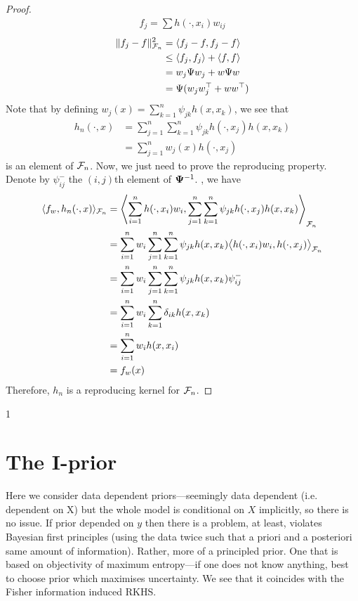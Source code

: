 \documentclass[a4paper,showframe,11pt,draft]{report}
\begin{document}
\begin{proof}
  \begin{align*}
    f_j = \sum h(\cdot,x_i)w_{ij}
  \end{align*}
  \begin{align*}
    \lVert f_j-f\rVert_{{\mathcal F}_n}^2 &= \langle f_j-f,f_j-f\rangle \\
    &\leq \langle f_j,f_j\rangle + \langle f,f\rangle \\
    &= w_j\Psi w_j + w\Psi w \\
    &= \Psi(w_jw_j^\top + ww^\top)
  \end{align*}
  Note that by defining $w_j(x) = \sum_{k=1}^n \psi_{jk} h(x,x_k)$, we see that
  \begin{align*}
    h_n(\cdot,x) 
    &= \sum_{j=1}^n\sum_{k=1}^n \psi_{jk} h(\cdot,x_j) h(x,x_k) \\
    &= \sum_{j=1}^n w_j(x)h(\cdot,x_j)
  \end{align*}
  is an element of ${\mathcal F}_n$.
  Now, we just need to prove the reproducing property. 
  Denote by $\psi_{ij}^{-}$ the $(i,j)$th element of ${\bm\Psi}^{-1}$.
  , we have
  \begin{align*}
    \langle f_w, h_n(\cdot,x)\rangle_{{\mathcal F}_n}
    &= \left\langle 
    \sum_{i=1}^n h(\cdot,x_i)w_i ,
    \sum_{j=1}^n\sum_{k=1}^n \psi_{jk} h(\cdot,x_j) h(x,x_k)
    \right\rangle_{{\mathcal F}_n} \\
    &= \sum_{i=1}^n w_i \sum_{j=1}^n\sum_{k=1}^n \psi_{jk}h(x,x_k) 
    \big\langle h(\cdot,x_i)w_i , h(\cdot,x_j) \big\rangle_{{\mathcal F}_n} \\
    &= \sum_{i=1}^n w_i \sum_{j=1}^n\sum_{k=1}^n \psi_{jk}h(x,x_k)\psi_{ij}^{-} \\
    &= \sum_{i=1}^n w_i \sum_{k=1}^n \delta_{ik}h(x,x_k) \\
    &= \sum_{i=1}^n w_i h(x,x_i) \\
    &= f_w(x)
  \end{align*}
  Therefore, $h_n$ is a reproducing kernel for ${\mathcal F}_n$.
\end{proof}

1



\newpage
\section{The I-prior}

Here we consider data dependent priors---seemingly data dependent (i.e. dependent on X) but the whole model is conditional on $X$ implicitly, so there is no issue.
If prior depended on $y$ then there is a problem, at least, violates Bayesian first principles (using the data twice such that a priori and a posteriori same amount of information).
Rather, more of a principled prior. One that is based on objectivity of maximum entropy---if one does not know anything, best to choose prior which maximises uncertainty.
We see that it coincides with the Fisher information induced RKHS.
\end{document}
